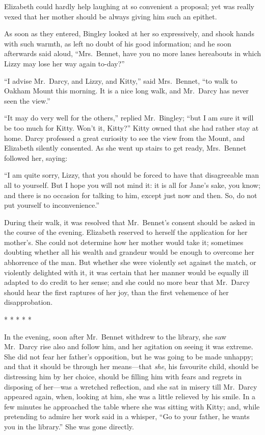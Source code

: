 Elizabeth could hardly help laughing at so convenient a
proposal; yet was really vexed that her mother should be
always giving him such an epithet.

As soon as they entered, Bingley looked at her so expressively,
and shook hands with such warmth, as left no doubt of his good
information; and he soon afterwards said aloud, ``Mrs.\ Bennet,
have you no more lanes hereabouts in which Lizzy may lose her
way again to-day?''

``I advise Mr.\ Darcy, and Lizzy, and Kitty,'' said Mrs.\ Bennet,
``to walk to Oakham Mount this morning.  It is a nice long walk,
and Mr.\ Darcy has never seen the view.''

``It may do very well for the others,'' replied Mr.\ Bingley; ``but
I am sure it will be too much for Kitty.  Won't it, Kitty?''
Kitty owned that she had rather stay at home.  Darcy professed
a great curiosity to see the view from the Mount, and Elizabeth
silently consented.  As she went up stairs to get ready,
Mrs.\ Bennet followed her, saying:

``I am quite sorry, Lizzy, that you should be forced to have
that disagreeable man all to yourself.  But I hope you will not
mind it: it is all for Jane's sake, you know; and there is no
occasion for talking to him, except just now and then.  So, do
not put yourself to inconvenience.''

During their walk, it was resolved that Mr.\ Bennet's consent
should be asked in the course of the evening.  Elizabeth
reserved to herself the application for her mother's.  She
could not determine how her mother would take it; sometimes
doubting whether all his wealth and grandeur would be enough
to overcome her abhorrence of the man.  But whether she were
violently set against the match, or violently delighted with
it, it was certain that her manner would be equally ill adapted
to do credit to her sense; and she could no more bear that
Mr.\ Darcy should hear the first raptures of her joy, than the
first vehemence of her disapprobation.

\begin{center}* * * * *\end{center}

In the evening, soon after Mr.\ Bennet withdrew to the library,
she saw Mr.\ Darcy rise also and follow him, and her agitation
on seeing it was extreme.  She did not fear her father's
opposition, but he was going to be made unhappy; and that it
should be through her means---that \emph{she}, his favourite child,
should be distressing him by her choice, should be filling him
with fears and regrets in disposing of her---was a wretched
reflection, and she sat in misery till Mr.\ Darcy appeared
again, when, looking at him, she was a little relieved by his
smile.  In a few minutes he approached the table where she was
sitting with Kitty; and, while pretending to admire her work
said in a whisper, ``Go to your father, he wants you in the
library.''  She was gone directly.

